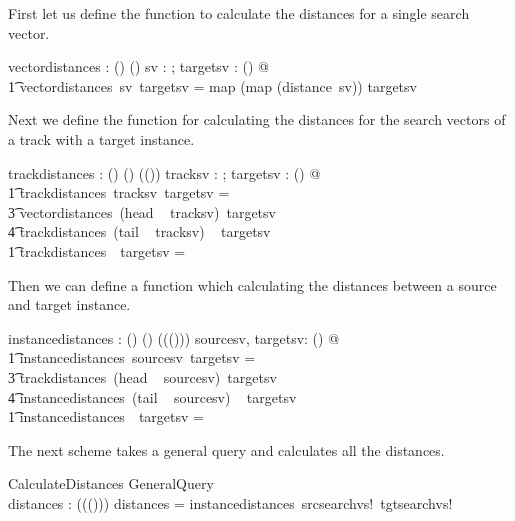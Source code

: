 \documentclass[11pt]{article}
\begin{document}
\begin{enumerate}
First let us define the function to calculate the distances for a single search vector.

\begin{axdef}		
	vectordistances : \Vdsl \fun \seq (\seq \Vdsl) \fun \seq (\seq \R) 
\where
	\forall sv : \Vdsl; targetsv : \seq (\seq \Vdsl) @ \\
	\t1  vectordistances~sv~targetsv = map (map (distance~sv)) targetsv
\end{axdef}

Next we define the function for calculating the distances for the search vectors of a track with a target instance. 

\begin{axdef}		
	trackdistances : (\seq \Vdsl) \fun \seq (\seq \Vdsl) \fun \seq (\seq (\seq \R)) 
\where
	\forall tracksv : \seq \Vdsl; targetsv : \seq (\seq \Vdsl) @ \\
	\t1  trackdistances~tracksv~targetsv = \\
	\t3 \langle vectordistances~(head ~ tracksv)~targetsv \rangle \cat \\
     \t4										  trackdistances~(tail ~ tracksv) ~ targetsv \land \\
     \t1  trackdistances~\langle \rangle ~targetsv = \langle \langle \langle \rangle \rangle \rangle 
\end{axdef} 
     
Then we can define a function which calculating the distances between a source and target instance. 

\begin{axdef}		
	instancedistances : \seq (\seq \Vdsl) \fun \seq (\seq \Vdsl) \fun \seq (\seq (\seq (\seq \R)))
\where
	\forall sourcesv, targetsv: \seq (\seq \Vdsl) @ \\
	\t1  instancedistances~sourcesv~targetsv = \\
	\t3 \langle trackdistances~(head ~ sourcesv)~targetsv \rangle \cat \\
     \t4 										  instancedistances~(tail ~ sourcesv) ~ targetsv  \land \\
     \t1  instancedistances~\langle \langle \rangle \rangle ~targetsv = \langle  \langle \langle \langle \rangle \rangle \rangle \rangle
\end{axdef}

The next scheme takes a general query and calculates all the distances.

\begin{schema}{CalculateDistances}
	GeneralQuery \\
	distances : \seq (\seq (\seq (\seq \R)))
\where
	distances = instancedistances~srcsearchvs!~tgtsearchvs!
\end{schema}


\end{enumerate}
\end{document}
